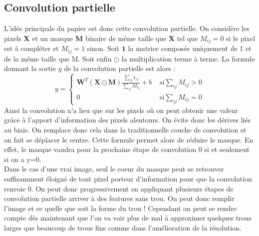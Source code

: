 \subsection{Convolution partielle}
L'idée principale du papier est donc cette convolution partielle. 
On considère les pixels \textbf{X} et un masque \textbf{M} binaire de même taille que \textbf{X} tel que $M_{ij} = 0$ si le pixel est à compléter et $M_{ij} = 1$ sinon. Soit $\textbf{1}$ la matrice composée uniquement de 1 et de la même taille que M. Soit enfin $\odot$ la multiplication terme à terme.
La formule donnant la sortie $y$ de la convolution partielle est alors :
\begin{equation}
    y = \left\{ \begin{array}{ll}
        \textbf{W}^T (\textbf{X} \odot \textbf{M} ) \frac{\sum_{ij} 1_{ij}}{\sum_{ij} M_{ij}}+ b & \mbox{ si} \sum_{ij} M_{ij} > 0 \\
        0 & \mbox{ si} \sum_{ij} M_{ij} = 0
        \end{array}
        \right.
\end{equation}
Ainsi la convolution n'a lieu que sur les pixels où on peut obtenir une valeur grâce à l'apport d'information des pixels alentours. On évite donc les dérives liés au biais. On remplace donc cela dans la traditionnelle couche de convolution et on fait se déplacer le centre. Cette formule permet alors de réduire le masque. En effet, le masque vaudra pour la prochaine étape de convolution 0 si et seulement si on a y=0.\\
Dans le cas d'une vrai image, seul le coeur du masque peut se retrouver suffisamment éloigné de tout pixel porteur d'information pour que la convolution renvoie 0. On peut donc progressivement en appliquant plusieurs étapes de convolution partielle arriver à des features sans trou. On peut donc remplir l'image et ce quelle que soit la forme du trou ! Cependant on peut se rendre compte dès maintenant que l'on va voir plus de mal à approximer quelques trous larges que beaucoup de trous fins comme dans l'amélioration de la résolution.

